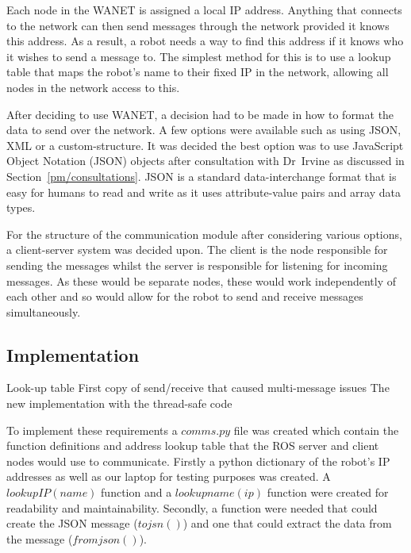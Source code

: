Each node in the WANET is assigned a local IP address.
Anything that connects to the network can then send messages through
the network provided it knows this address. As a result, a robot
needs a way to find this address if it knows who it wishes to send
a message to. The simplest method for this is to use a lookup table
that maps the robot's name to their fixed IP in the network, allowing
all nodes in the network access to this.

After deciding to use WANET, a decision  had to be made in how to format
the data to send over the network. A few options were available such as
using JSON, XML or a custom-structure. It was decided the best option was
to use JavaScript Object Notation (JSON) objects after consultation with
Dr~Irvine as discussed in Section~\ref{pm/consultations}. JSON is a
standard data-interchange format that is easy for humans to read and write
as it uses attribute-value pairs and array data types.

For the structure of the communication module after considering various options,
a client-server system was decided upon. The client is the node
responsible for sending the messages whilst the server is responsible
for listening for incoming messages. As these would be separate nodes,
these would work independently of each other and so would allow for the
robot to send and receive messages simultaneously.

\subsection{Implementation}\label{soft/comms/impl}
Look-up table
First copy of send/receive that caused multi-message issues
The new implementation with the thread-safe code

To implement these requirements a $comms.py$ file was created which contain
the function definitions and address lookup table that the ROS server and
client nodes would use to communicate. Firstly a python dictionary of the
robot's IP addresses as well as our laptop for testing purposes was created.
A $lookupIP(name)$ function and a $lookupname(ip)$ function were created for
readability and maintainability. Secondly, a function were needed that could
create the JSON message ($tojsn()$) and one that could extract the data from
the message ($fromjson()$).

